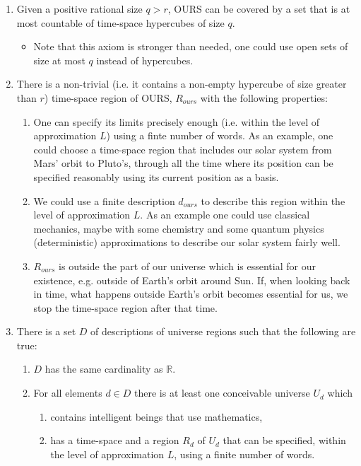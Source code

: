 \documentclass[a4paper
,draft
]{article}
\def\reale{\mathbb{R}}
\begin{document}
\begin{enumerate}
\item \label{countablecovering} Given a positive rational size $q>r$, OURS can be covered by a set that is at most countable of time-space hypercubes of size $q$.
  \begin{itemize}
    \item Note that this axiom is stronger than needed, one could use open sets of size at most $q$ instead of hypercubes.
  \end{itemize}

\item \label{nonessentialhypercube} There is a non-trivial (i.e. it contains a non-empty hypercube of size greater than $r$) time-space region of OURS, $R_{ours}$ with the following properties:
  \begin{enumerate}
    \item One can specify its limits precisely enough (i.e. within the level of approximation $L$) using a finte number of words. As an example, one could choose a time-space region that includes our solar system from Mars' orbit to Pluto's, through all the time where its position can be specified reasonably using its current position as a basis.
    \item We could use a finite description $d_{ours}$ to describe this region within the level of approximation $L$. As an example one could use classical mechanics, maybe with some chemistry and some quantum physics (deterministic) approximations to describe our solar system fairly well.
    \item $R_{ours}$ is outside the part of our universe which is essential for our existence, e.g. outside of Earth's orbit around Sun. If, when looking back in time, what happens outside Earth's orbit becomes essential for us, we stop the time-space region after that time.
  \end{enumerate}
\item \label{uncountable} There is a set $D$ of descriptions of universe regions such that the following are true:
  \begin{enumerate}
    \item $D$ has the same cardinality as $\reale$.
    \item For all elements $d\in D$ there is at least one conceivable universe $U_d$ which
      \begin{enumerate}
        \item contains intelligent beings that use mathematics,
        \item has a time-space and a region $R_d$ of $U_d$ that can be specified, within the level of approximation $L$, using a finite number of words.

\end{enumerate}
\end{enumerate}
\end{enumerate}
\end{document}
